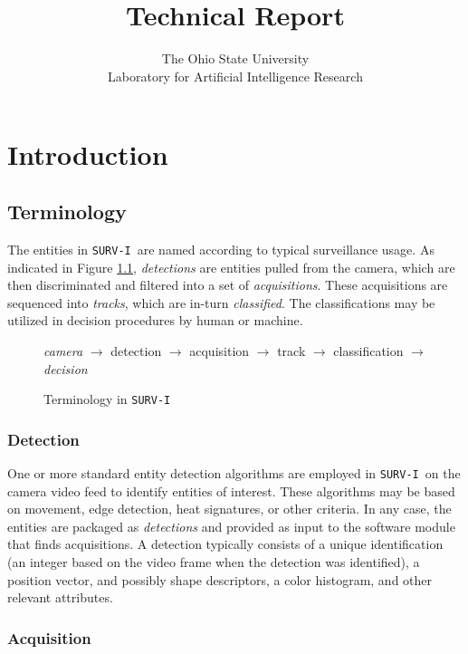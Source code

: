 \documentclass{book}
\title{\prog\\Technical Report}
\author{The Ohio State University\\Laboratory for Artificial Intelligence
Research}
\newcommand{\prog}{{\tt SURV-I}~}
\begin{document}
\maketitle
\tableofcontents

\chapter{Introduction}
\label{sec:introduction}

\section{Terminology}
\label{sec:terminology}

The entities in \prog are named according to typical surveillance usage. As
indicated in Figure \ref{fig:four-terms}, \emph{detections} are entities
pulled from the camera, which are then discriminated and filtered into a set of
\emph{acquisitions}. These acquisitions are sequenced into \emph{tracks}, which
are in-turn \emph{classified}. The classifications may be utilized in decision
procedures by human or machine.

\begin{figure}[ht]
\label{fig:four-terms}
\begin{center}
\emph{camera} $\rightarrow$ detection $\rightarrow$ acquisition $\rightarrow$
track $\rightarrow$ classification $\rightarrow$ \emph{decision}
\end{center}
\caption{Terminology in \prog}
\end{figure}

\subsection{Detection}
\label{sec:detection}

One or more standard entity detection algorithms are employed in \prog on the
camera video feed to identify entities of interest. These algorithms may be
based on movement, edge detection, heat signatures, or other criteria. In any
case, the entities are packaged as \emph{detections} and provided as input to
the software module that finds acquisitions. A detection typically consists of a
unique identification (an integer based on the video frame when the detection
was identified), a position vector, and possibly shape descriptors, a color
histogram, and other relevant attributes.

\subsection{Acquisition}
\label{sec:acquisition}
\end{document}
